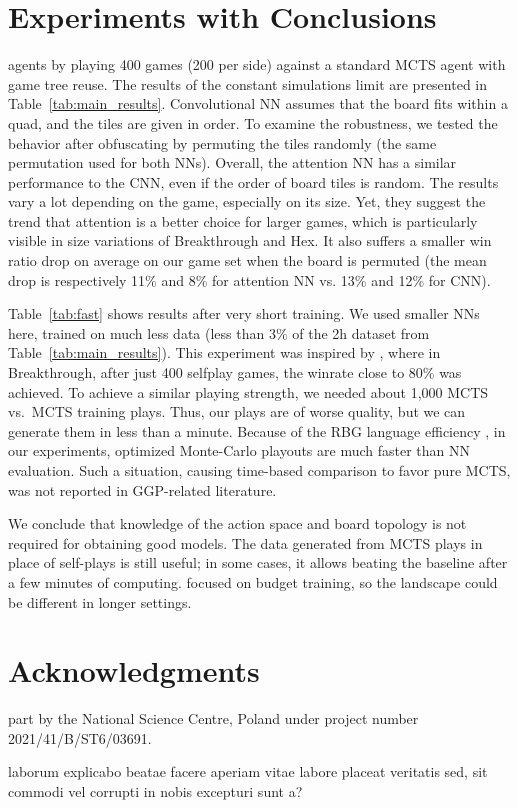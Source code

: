 \documentclass[letterpaper]{article}
\begin{document}
\section{Experiments with Conclusions}

 agents by playing 400 games (200 per side) against a standard MCTS agent with game tree reuse. The results of the constant simulations limit are presented in Table~\ref{tab:main_results}.
Convolutional NN assumes that the board fits within a quad, and the tiles are given in order.
To examine the robustness, we tested the behavior after obfuscating by permuting the tiles randomly (the same permutation used for both NNs).
Overall, the attention NN has a similar performance to the CNN, even if the order of board tiles is random. The results vary a lot depending on the game, especially on its size.
Yet, they suggest the trend that attention is a better choice for larger games, which is particularly visible in size variations of Breakthrough and Hex.
It also suffers a smaller win ratio drop on average on our game set when the board is permuted (the mean drop is respectively 11\% and 8\% for attention NN vs. 13\% and 12\% for CNN).

Table~\ref{tab:fast} shows results after very short training.
We used smaller NNs here, trained on much less data (less than $3\%$ of the 2h dataset from Table~\ref{tab:main_results}).
This experiment was inspired by \cite{ThielscherAAAI20}, where in Breakthrough, after just 400 selfplay games, the winrate close to 80\% was achieved.
To achieve a similar playing strength, we needed about 1,000 MCTS vs.\ MCTS training plays. Thus, our plays are of worse quality, but we can generate them in less than a minute.
Because of the RBG language efficiency \cite{Kowalski2020EfficientReasoning}, in our experiments, optimized Monte-Carlo playouts are much faster than NN evaluation. Such a situation, causing time-based comparison to favor pure MCTS, was not reported in GGP-related literature.

We conclude that knowledge of the action space and board topology is not required for obtaining good models.
The data generated from MCTS plays in place of self-plays is still useful; in some cases, it allows beating the baseline after a few minutes of computing.
 focused on budget training, so the landscape could be different in longer settings.




\section{Acknowledgments}
 part by the National Science Centre, Poland under project number 2021/41/B/ST6/03691.

 laborum explicabo beatae facere aperiam vitae labore placeat veritatis sed, sit commodi vel corrupti in nobis excepturi sunt a?\clearpage

\end{document}
